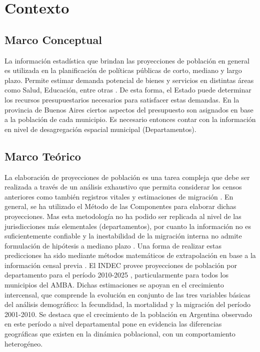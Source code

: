 \documentclass{article}
\theoremstyle{mytheoremstyle}
\theoremstyle{mytheoremstyle}
\theoremstyle{myproblemstyle}
\begin{document}
\section{Contexto}
\subsection{Marco Conceptual}
  La información estadística que brindan las proyecciones de población en general es utilizada en  la planificación
   de políticas públicas de corto, mediano y largo plazo.
   Permite estimar demanda potencial de bienes y servicios en distintas áreas como Salud, Educación, entre otras .\newline\newline
   De esta forma, el Estado puede determinar los recursos presupuestarios necesarios para satisfacer estas demandas. 
   En la provincia de Buenos Aires ciertos aspectos del presupuesto son asignados en base a la población de cada municipio. 
   Es necesario entonces contar con la información en nivel de desagregación espacial municipal (Departamentos).
  \subsection{Marco Teórico}
  La elaboración de proyecciones de población es una tarea compleja que debe ser realizada a través de un
   análisis exhaustivo que permita considerar los censos anteriores como también registros vitales y
   estimaciones de migración .\newline\newline
   En general, se ha utilizado el Método de las Componentes para elaborar dichas proyecciones.
    Mas esta metodología no ha podido ser replicada al nivel de las 
    jurisdicciones más elementales (departamentos), por cuanto la información no es suficientemente confiable
     y la inestabilidad de la migración interna no admite formulación de hipótesis a mediano plazo .
     Una forma de realizar estas predicciones ha sido mediante métodos matemáticos de extrapolación en base
    a la información censal previa .\newline\newline
   El INDEC provee proyecciones de población por departamento para el período 2010-2025 , 
   particularmente para todos los municipios del AMBA. Dichas estimaciones se apoyan en el crecimiento intercensal, que comprende la evolución en conjunto
   de las tres variables básicas del análisis demográfico: la fecundidad, la mortalidad y la migración del período
   2001-2010. Se destaca que el crecimiento de la población en Argentina observado en este período a nivel departamental 
   pone en evidencia las diferencias geográficas que existen en la dinámica poblacional, con un comportamiento heterogéneo.
  
\end{document}
